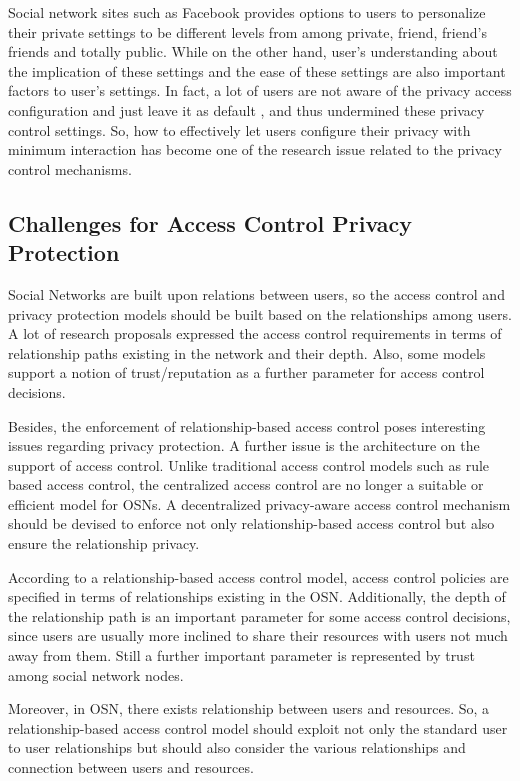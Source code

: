\documentclass[12pt]{article}
\begin{document}
Social network sites such as Facebook provides options to users to
personalize their private settings to be different levels from among
private, friend, friend's friends and totally public. While on the
other hand, user's understanding about the implication of these
settings and the ease of these settings are also important factors to
user's settings. In fact, a lot of users are not aware of the privacy
access configuration and just leave it as default
\cite{privacy-wizard}\cite{imagined-facebook-privacy}\cite{privacy-from-audience},
and thus undermined these privacy control settings. So, how to
effectively let users configure their privacy with minimum interaction
has become one of the research issue related to the privacy control
mechanisms.

\subsection{Challenges for Access Control Privacy Protection}
Social Networks are built upon relations between users, so the access
control and privacy protection models should be built based on the
relationships among users. A lot of research proposals expressed the
access control requirements in terms of relationship paths existing in
the network and their depth. Also, some models support a notion of
trust/reputation as a further parameter for access control decisions.

Besides, the enforcement of relationship-based access control poses
interesting issues regarding privacy protection. A further issue is
the architecture on the support of access control. Unlike traditional
access control models such as rule based access control, the
centralized access control are no longer a suitable or efficient model
for OSNs\cite{}. A decentralized privacy-aware access control
mechanism should be devised to enforce not only relationship-based
access control but also ensure the relationship privacy.

According to a relationship-based access control model, access control
policies are specified in terms of relationships existing in the
OSN. Additionally, the depth of the relationship path is an important
parameter for some access control decisions, since users are usually
more inclined to share their resources with users not much away from
them. Still a further important parameter is represented by trust
among social network nodes.

Moreover, in OSN, there exists relationship between users and
resources. So, a relationship-based access control model should
exploit not only the standard user to user relationships but should
also consider the various relationships and connection between users
and resources.
\end{document}
